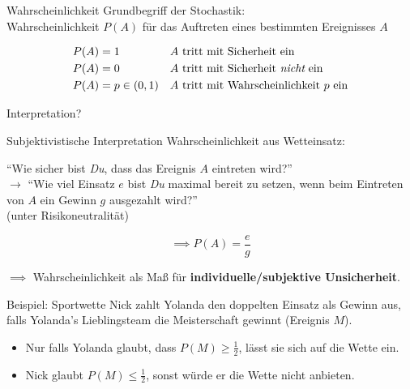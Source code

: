\documentclass[
  10pt,
  ignorenonframetext,
]{beamer}
\providecommand{\tightlist}{%
  \setlength{\itemsep}{0pt}\setlength{\parskip}{0pt}}
\begin{document}
\begin{frame}{Wahrscheinlichkeit}
\protect\hypertarget{wahrscheinlichkeit}{}
Grundbegriff der Stochastik:\\
Wahrscheinlichkeit \(P(A)\) für das Auftreten eines bestimmten
Ereignisses \(A\)

\begin{align*}
P(A) & =  1           &  & A \text{ tritt mit Sicherheit ein}\\
P(A) & =  0           &  & A \text{ tritt mit Sicherheit {\em nicht} ein}\\
P(A) & =  p \in (0,1) &  & A \text{ tritt mit Wahrscheinlichkeit $p$ ein}
\end{align*}

Interpretation?

\end{frame}

\begin{frame}{Subjektivistische Interpretation}
\protect\hypertarget{subjektivistische-interpretation}{}
Wahrscheinlichkeit aus Wetteinsatz:

``Wie sicher bist \emph{Du}, dass das Ereignis \(A\) eintreten wird?''\\
\(\longrightarrow\) ``Wie viel Einsatz \(e\) bist \emph{Du} maximal
bereit zu setzen, wenn beim Eintreten von \(A\) ein Gewinn \(g\)
ausgezahlt wird?''\\
(unter Risikoneutralität)

\[\implies P(A) = \frac{e}{g}\]

\(\implies\) Wahrscheinlichkeit als Maß für
\textbf{individuelle/subjektive Unsicherheit}.

\end{frame}

\begin{frame}{Beispiel: Sportwette}
\protect\hypertarget{beispiel-sportwette}{}
Nick zahlt Yolanda den doppelten Einsatz als Gewinn aus, falls Yolanda's
Lieblingsteam die Meisterschaft gewinnt (Ereignis \(M\)).

\begin{itemize}
\tightlist
\item
  Nur falls Yolanda glaubt, dass \(P(M) \geq \frac12\), lässt sie sich
  auf die Wette ein.
\item
  Nick glaubt \(P(M) \leq \frac12\), sonst würde er die Wette nicht
  anbieten.
\end{itemize}
\end{frame}
\end{document}
